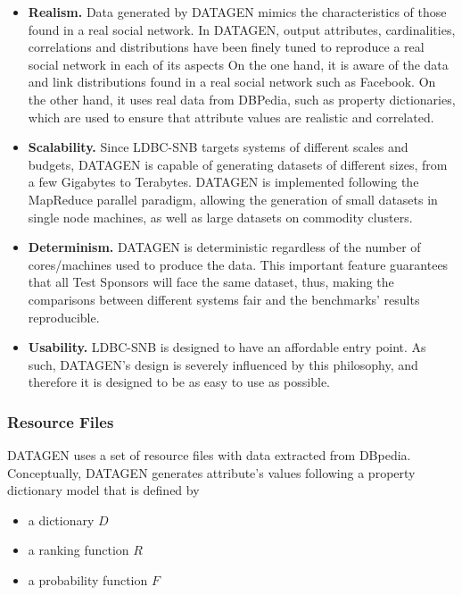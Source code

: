 \begin{itemize}
    \item \textbf{Realism.} Data generated by DATAGEN mimics the
        characteristics of those found in a real social network. In DATAGEN,
        output attributes, cardinalities, correlations and distributions have
        been finely tuned to reproduce a real social network in each of its
        aspects On the one hand, it is aware of the  data and link distributions
        found in a real social network such as Facebook. On the other hand, it
        uses real data from DBPedia, such as property dictionaries, which are
        used to ensure that attribute values are realistic and correlated.
    \item \textbf{Scalability.} Since LDBC-SNB targets systems of different
        scales and budgets, DATAGEN is capable of generating datasets of
        different sizes, from a few Gigabytes to Terabytes. DATAGEN is
        implemented following the MapReduce parallel paradigm, allowing the
        generation of small datasets in single node machines, as well as large
        datasets on commodity clusters.
    \item \textbf{Determinism.} DATAGEN is deterministic regardless of the number
        of cores/machines used to produce the data. This important feature
        guarantees that all Test Sponsors will face the same dataset,
        thus, making the comparisons between different systems fair and the
        benchmarks' results reproducible.
    \item \textbf{Usability.} LDBC-SNB is designed to have an affordable entry
        point. As such, DATAGEN's design is  severely influenced by this
        philosophy, and therefore it is designed to be as easy to use as
        possible.
\end{itemize}


\subsubsection{Resource Files}

DATAGEN uses a set of resource files with data
extracted from DBpedia. Conceptually, DATAGEN generates attribute's
values following a property dictionary model that is defined by

\begin{itemize}
    \item a dictionary $D$
    \item a ranking function $R$
    \item a probability function $F$
\end{itemize}

